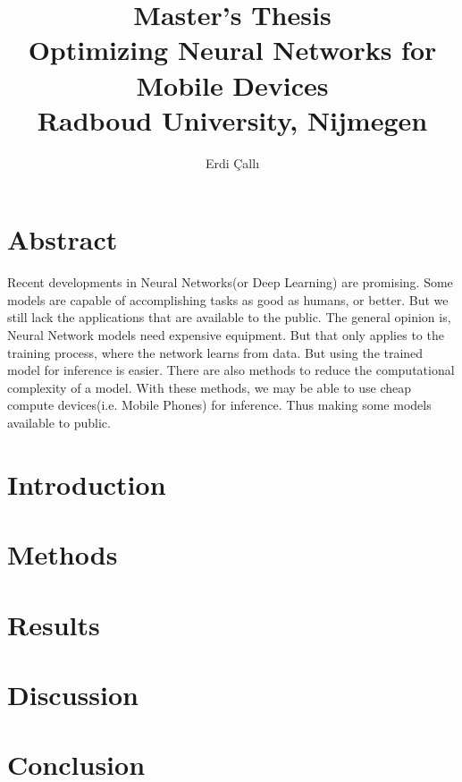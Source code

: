 \documentclass[12pt]{report}
\title{
{\textbf{Master's Thesis}\\Optimizing Neural Networks for Mobile Devices}\\
{\large Radboud University, Nijmegen}
}
\author{Erdi \c{C}all{\i}}
\begin{document}
\maketitle
\chapter*{Abstract}
Recent developments in Neural Networks(or Deep Learning) are promising. Some models are capable of accomplishing tasks as good as humans, or better. But we still lack the applications that are available to the public. The general opinion is, Neural Network models need expensive equipment. But that only applies to the training process, where the network learns from data. But using the trained model for inference is easier. There are also methods to reduce the computational complexity of a model. With these methods, we may be able to use cheap compute devices(i.e. Mobile Phones) for inference. Thus making some models available to public. 




\tableofcontents

\chapter{Introduction}


\chapter{Methods}


\chapter{Results}


\chapter{Discussion}


\chapter{Conclusion}






\end{document}

